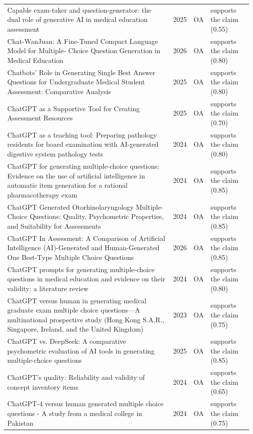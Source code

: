 \begin{longtable}{@{}%
  >{\raggedright\arraybackslash}p{}c%
  >{\raggedright\arraybackslash}p{}%
  >{\raggedright\arraybackslash}p{}@{}}
Capable exam-taker and question-generator: the dual role of generative AI in medical education assessment & 2025 & OA & supports the claim (0.55) \\
Chat-WanJuan: A Fine-Tuned Compact Language Model for Multiple- Choice Question Generation in Medical Education & 2026 & OA & supports the claim (0.80) \\
Chatbots' Role in Generating Single Best Answer Questions for Undergraduate Medical Student Assessment: Comparative Analysis & 2025 & OA & supports the claim (0.80) \\
ChatGPT as a Supportive Tool for Creating Assessment Resources & 2025 & OA & supports the claim (0.70) \\
ChatGPT as a teaching tool: Preparing pathology residents for board examination with AI-generated digestive system pathology tests & 2024 & OA & supports the claim (0.80) \\
ChatGPT for generating multiple-choice questions: Evidence on the use of artificial intelligence in automatic item generation for a rational pharmacotherapy exam & 2024 & OA & supports the claim (0.85) \\
ChatGPT Generated Otorhinolaryngology Multiple-Choice Questions: Quality, Psychometric Properties, and Suitability for Assessments & 2024 & OA & supports the claim (0.85) \\
ChatGPT In Assessment: A Comparison of Artificial Intelligence (AI)-Generated and Human-Generated One Best-Type Multiple Choice Questions & 2026 & OA & supports the claim (0.85) \\
ChatGPT prompts for generating multiple-choice questions in medical education and evidence on their validity: a literature review & 2024 & OA & supports the claim (0.80) \\
ChatGPT versus human in generating medical graduate exam multiple choice questions---A multinational prospective study (Hong Kong S.A.R., Singapore, Ireland, and the United Kingdom) & 2023 & OA & supports the claim (0.75) \\
ChatGPT vs. DeepSeek: A comparative psychometric evaluation of AI tools in generating multiple-choice questions & 2025 & OA & supports the claim (0.85) \\
ChatGPT's quality: Reliability and validity of concept inventory items & 2024 & OA & supports the claim (0.65) \\
ChatGPT-4 versus human generated multiple choice questions - A study from a medical college in Pakistan & 2024 & OA & supports the claim (0.75) \\

\end{longtable}

